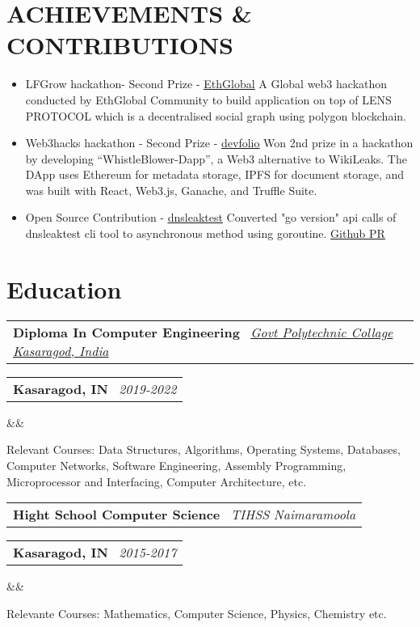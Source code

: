 \documentclass[11pt,a4paper,sans]{moderncv}
\makeatletter
\newcommand*{\customcventry}[7][.13em]{
	\begin{tabular}{@{}l}
	{\bfseries #4} \
	{\itshape #3}
	\end{tabular}
	\hfill
	\begin{tabular}{l@{}}
	{\bfseries #5} \
	{\itshape #2}
	\end{tabular}
	\ifx&#7&
	\else{\
	\begin{minipage}{\maincolumnwidth}
	\small#7
	\end{minipage}}\fi
	\par\addvspace{#1}
}
\makeatother
\begin{document}
\section{ACHIEVEMENTS \& CONTRIBUTIONS}
 {\begin{itemize}[label=\textbullet]
	  \item LFGrow hackathon- Second Prize - \underline{\color{blue}\href{https://ethglobal.com/showcase/zilly-b3y8b}{EthGlobal}}
	        \newline A Global web3 hackathon conducted by EthGlobal Community to
	        build application on top of LENS PROTOCOL which is a
	        decentralised social graph using polygon blockchain.

	  \item Web3hacks hackathon - Second Prize - \underline{\color{blue}\href{https://devfolio.co/projects/whistleblower-c8a5}{devfolio}}
	        \newline Won 2nd prize in a hackathon by developing “WhistleBlower-Dapp”, a Web3
	        alternative to WikiLeaks. The DApp uses Ethereum for metadata storage, IPFS for
	        document storage, and was built with React, Web3.js, Ganache, and Truffle Suite.

	  \item Open Source Contribution - \underline{\color{blue}\href{https://github.com/macvk/dnsleaktest}{dnsleaktest}}
	        \newline Converted "go version"
	        api calls of dnsleaktest cli tool to
	        asynchronous method using goroutine. \underline{\color{blue}\href{https://github.com/macvk/dnsleaktest/pull/12}{Github PR}}

  \end{itemize}}

\section{Education}
\customcventry{2019-2022}
{\color{blue}\href{https://gpckasaragod.ac.in/} {Govt Polytechnic Collage Kasaragod, India}}
{Diploma In Computer Engineering}{Kasaragod, IN}{}{}
{Relevant Courses:
	Data Structures, Algorithms, Operating Systems, Databases, Computer Networks,
	Software Engineering, Assembly Programming, Microprocessor and Interfacing,
	Computer Architecture, etc.}
\newline

\customcventry{2015-2017}{{TIHSS Naimaramoola}}{Hight School Computer Science}{Kasaragod, IN}{}{}{Relevante Courses: Mathematics, Computer Science, Physics, Chemistry  etc.}
\end{document}
